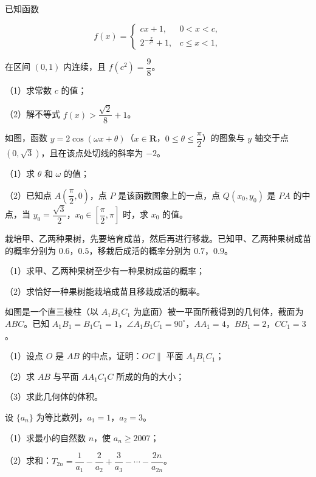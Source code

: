 \begin{question}
已知函数

\nopagebreak[4]
\[f(x)=\begin{cases}cx+1,&0<x<c,\\ 2^{-\frac{x}{c^2}}+1,&c\leqslant x<1,\end{cases}\]

在区间 $(0,1)$ 内连续，且 $f(c^2)=\dfrac98$。

（1）求常数 $c$ 的值；

（2）解不等式 $f(x)>\dfrac{\sqrt2}{8}+1$。

\Needspace{0.4\textheight}
\end{question}
\begin{question}
如图，函数 $y=2\cos(\omega x+\theta)$（$x\in\mathbf R$，$0\leqslant\theta\leqslant\dfrac{\pi}{2}$）的图象与 $y$ 轴交于点 $(0,\sqrt3)$，且在该点处切线的斜率为 $-2$。

（1）求 $\theta$ 和 $\omega$ 的值；

（2）已知点 $A\left(\dfrac{\pi}{2},0\right)$，点 $P$ 是该函数图象上的一点，点 $Q(x_0,y_0)$ 是 $PA$ 的中点，当 $y_0=\dfrac{\sqrt3}{2}$，$x_0\in\left[\dfrac{\pi}{2},\pi\right]$ 时，求 $x_0$ 的值。
\nopagebreak[4]
\begin{center}\end{center}
\nopagebreak[4]
\end{question}
\begin{question}
栽培甲、乙两种果树，先要培育成苗，然后再进行移栽。已知甲、乙两种果树成苗的概率分别为 $0.6$，$0.5$，移栽后成活的概率分别为 $0.7$，$0.9$。

（1）求甲、乙两种果树至少有一种果树成苗的概率；

（2）求恰好一种果树能栽培成苗且移栽成活的概率。

\Needspace{0.4\textheight}
\end{question}
\begin{question}
如图是一个直三棱柱（以 $A_1B_1C_1$ 为底面）被一平面所截得到的几何体，截面为 $ABC$。已知 $A_1B_1=B_1C_1=1$，$\angle A_1B_1C_1=90^\circ$，$AA_1=4$，$BB_1=2$，$CC_1=3$。

（1）设点 $O$ 是 $AB$ 的中点，证明：$OC\parallel$ 平面 $A_1B_1C_1$；

（2）求 $AB$ 与平面 $AA_1C_1C$ 所成的角的大小；

（3）求此几何体的体积。
\nopagebreak[4]
\begin{center}\end{center}
\nopagebreak[4]
\end{question}
\begin{question}
设 $\{a_n\}$ 为等比数列，$a_1=1$，$a_2=3$。

（1）求最小的自然数 $n$，使 $a_n\geqslant2007$；

（2）求和：$T_{2n}=\dfrac1{a_1}-\dfrac2{a_2}+\dfrac3{a_3}-\cdots-\dfrac{2n}{a_{2n}}$。

\end{question}